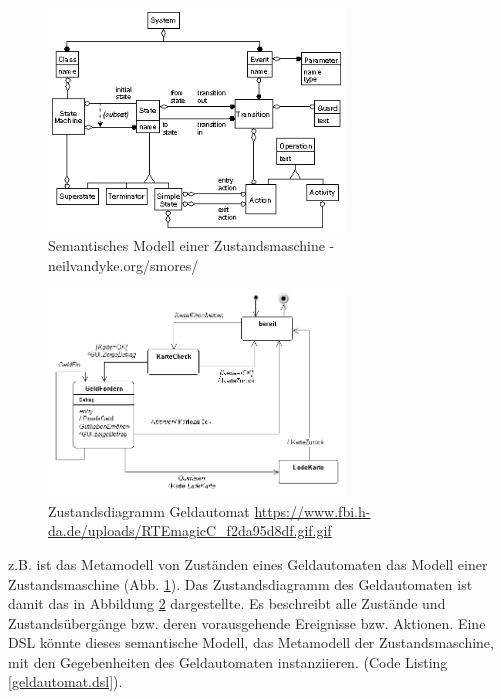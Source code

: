 \documentclass[11pt,english,ngerman, headsepline]{scrreprt}
\begin{document}
\begin{figure}[h!]
	\begin{center}
	\includegraphics[width=0.7\textwidth]{pics/data-model.jpg}
	\end{center}
	\caption{Semantisches Modell einer 	Zustandsmaschine
	- neilvandyke.org/smores/ }
	\label{state-machine-semantic-model}
\end{figure}

\begin{figure}[h!]
	\begin{center}
	\includegraphics[width=0.7\textwidth]{pics/zutandsdiaGeldautomat.jpg}
	\end{center}
	\caption{Zustandsdiagramm Geldautomat
	\url{https://www.fbi.h-da.de/uploads/RTEmagicC_f2da95d8df.gif.gif} }
	\label{zutandsdiaGeldautomat.jpg}
\end{figure}

z.B. ist das Metamodell von Zuständen eines Geldautomaten das Modell einer
Zustandsmaschine (Abb. \ref{state-machine-semantic-model}). Das Zustandsdiagramm
des Geldautomaten ist damit das in Abbildung \ref{zutandsdiaGeldautomat.jpg}
dargestellte. Es beschreibt alle Zustände und Zustandsübergänge bzw. deren
vorausgehende Ereignisse bzw. Aktionen. Eine DSL könnte dieses semantische
Modell, das Metamodell der Zustandsmaschine, mit den Gegebenheiten des
Geldautomaten instanziieren. (Code Listing \ref{geldautomat.dsl}).
   
\end{document}
